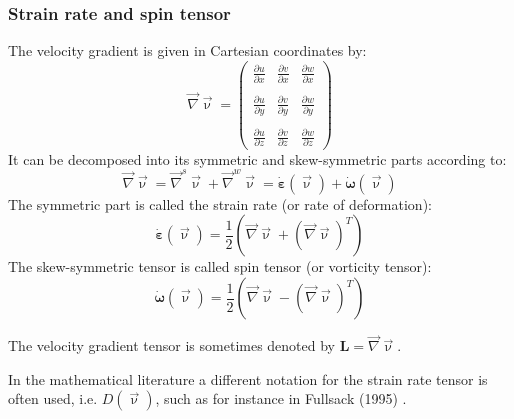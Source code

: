 \subsubsection{Strain rate and spin tensor} \label{ss:srst}

The velocity gradient is given in Cartesian coordinates by:
\begin{equation}
\vec\nabla\vec\upnu = 
\left(
\begin{array}{ccc}
\frac{\partial u}{\partial x} & \frac{\partial v}{\partial x} & \frac{\partial w}{\partial x} \\\\
\frac{\partial u}{\partial y} & \frac{\partial v}{\partial y} & \frac{\partial w}{\partial y} \\\\
\frac{\partial u}{\partial z} & \frac{\partial v}{\partial z} & \frac{\partial w}{\partial z} 
\end{array}
\right)
\end{equation}
It can be decomposed into its symmetric and skew-symmetric parts according to:
\begin{equation}
\vec\nabla\vec\upnu = \vec\nabla^s\vec\upnu + \vec\nabla^w\vec\upnu = \dot{\bm \varepsilon}(\vec \upnu) +  \dot{\bm \omega}(\vec \upnu)
\end{equation}
The symmetric part is called the strain rate (or rate of deformation):
\begin{equation}
\dot{\bm \varepsilon}(\vec \upnu) = \frac{1}{2}\left( \vec\nabla\vec\upnu + (\vec\nabla\vec\upnu)^T \right)
\end{equation}
The skew-symmetric tensor is called spin tensor (or vorticity tensor):
\begin{equation}
\dot{\bm \omega}(\vec \upnu) = \frac{1}{2}\left( \vec\nabla\vec\upnu - (\vec\nabla\vec\upnu)^T \right)
\end{equation}

\begin{remark}
The velocity gradient tensor is sometimes denoted by ${\bm L}=\vec\nabla\vec\upnu$.
\end{remark}

\begin{remark}
In the mathematical literature a different notation for the strain rate tensor is often used, i.e. 
$D(\vec \upnu)$, such as for instance in Fullsack (1995) \cite{full95}.
\end{remark}

